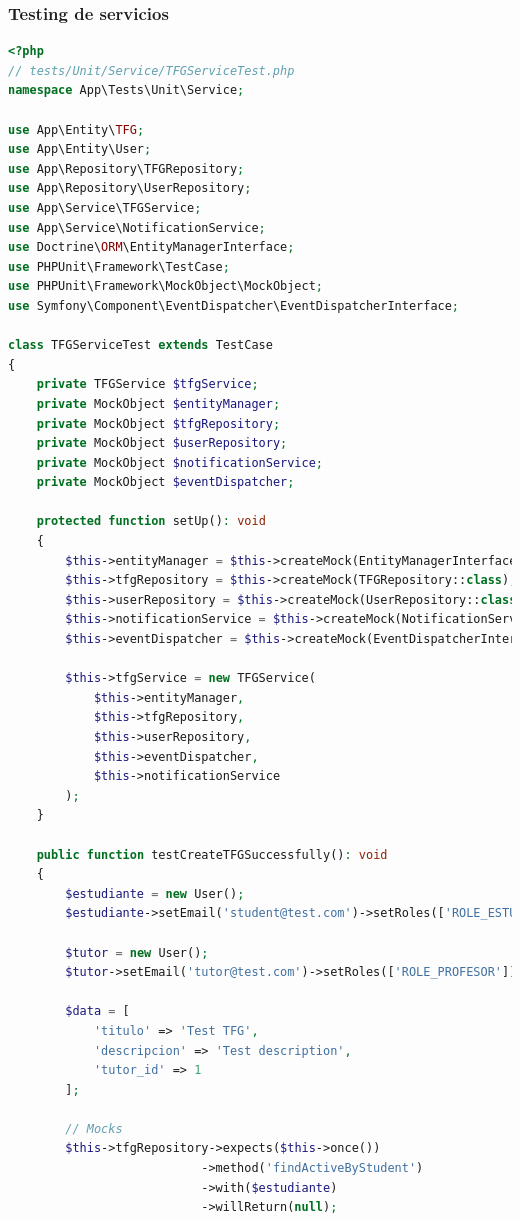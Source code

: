 \documentclass[12pt,a4paper,oneside]{report}
\begin{document}
\subsubsection{Testing de servicios}\label{testing-de-servicios}

\begin{lstlisting}[language=PHP]
<?php
// tests/Unit/Service/TFGServiceTest.php
namespace App\Tests\Unit\Service;

use App\Entity\TFG;
use App\Entity\User;
use App\Repository\TFGRepository;
use App\Repository\UserRepository;
use App\Service\TFGService;
use App\Service\NotificationService;
use Doctrine\ORM\EntityManagerInterface;
use PHPUnit\Framework\TestCase;
use PHPUnit\Framework\MockObject\MockObject;
use Symfony\Component\EventDispatcher\EventDispatcherInterface;

class TFGServiceTest extends TestCase
{
    private TFGService $tfgService;
    private MockObject $entityManager;
    private MockObject $tfgRepository;
    private MockObject $userRepository;
    private MockObject $notificationService;
    private MockObject $eventDispatcher;

    protected function setUp(): void
    {
        $this->entityManager = $this->createMock(EntityManagerInterface::class);
        $this->tfgRepository = $this->createMock(TFGRepository::class);
        $this->userRepository = $this->createMock(UserRepository::class);
        $this->notificationService = $this->createMock(NotificationService::class);
        $this->eventDispatcher = $this->createMock(EventDispatcherInterface::class);

        $this->tfgService = new TFGService(
            $this->entityManager,
            $this->tfgRepository,
            $this->userRepository,
            $this->eventDispatcher,
            $this->notificationService
        );
    }

    public function testCreateTFGSuccessfully(): void
    {
        $estudiante = new User();
        $estudiante->setEmail('student@test.com')->setRoles(['ROLE_ESTUDIANTE']);

        $tutor = new User();
        $tutor->setEmail('tutor@test.com')->setRoles(['ROLE_PROFESOR']);

        $data = [
            'titulo' => 'Test TFG',
            'descripcion' => 'Test description',
            'tutor_id' => 1
        ];

        // Mocks
        $this->tfgRepository->expects($this->once())
                           ->method('findActiveByStudent')
                           ->with($estudiante)
                           ->willReturn(null);


\end{lstlisting}
\end{document}
